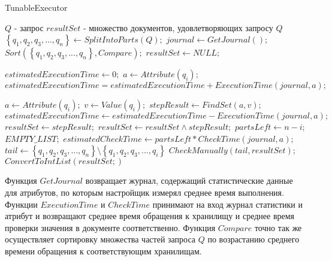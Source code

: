 \documentclass{matmex-diploma}
\begin{document}
        \begin{algorithm}[H]                   
        \caption{TunableExecutor}              
        \label{tunable}                        
            \begin{algorithmic}        
                \REQUIRE $Q$ - запрос
                \ENSURE $resultSet$ - множество документов, удовлетворяющих запросу $Q$
                \STATE $\left\{ q_1, q_2, q_3, ... , q_n \right\} \leftarrow SplitIntoParts(Q);$
                \STATE $journal \leftarrow GetJournal();$
                \STATE $Sort(\left\{ q_1, q_2, q_3, ... , q_n \right\}, Compare);$
                \STATE $resultSet \leftarrow NULL;$
                
                \STATE $estimatedExecutionTime \leftarrow 0;$
                    \STATE $a \leftarrow Attribute(q_i);$
                    \STATE $estimatedExecutionTime = estimatedExecutionTime + ExecutionTime(journal, a);$
                \ENDFOR
                
                    \STATE $a \leftarrow Attribute(q_i);$
                    \STATE $v \leftarrow Value(q_i);$
                    \STATE $stepResult \leftarrow FindSet(a, v);$
                    \STATE $estimatedExecutionTime \leftarrow estimatedExecutionTime - ExecutionTime(journal, a);$
                        \STATE $resultSet \leftarrow stepResult;$
                    \ELSE
                        \STATE $resultSet \leftarrow resultSet \land stepResult;$
                    \ENDIF
                    \STATE $partsLeft \leftarrow n - i;$
                        \RETURN $EMPTY\_LIST;$
                    \ENDIF
                    \STATE $estimatedCheckTime \leftarrow partsLeft * CheckTime(journal, a);$
                        \STATE $tail \leftarrow \left\{ q_1, q_2, q_3, ... , q_n \right\} \setminus \left\{ q_1, q_2, q_3, ... , q_i \right\}$
                        \RETURN $CheckManually(tail, resultSet);$
                    \ENDIF
                \ENDFOR
                \RETURN $ConvertToIntList(resultSet;)$
            \end{algorithmic}
        \end{algorithm}
        
        Функция $GetJournal$ возвращает журнал, содержащий статистические данные для атрибутов, по которым настройщик измерял среднее время выполнения. Функции $ExecutionTime$ и $CheckTime$ принимают на вход журнал статистики и атрибут и возвращают среднее время обращения к хранилищу и среднее время проверки значения в документе соответственно. Функция $Compare$ точно так же осуществляет сортировку множества частей запроса $Q$ по возрастанию среднего времени обращения к соответствующим хранилищам.   
        
\end{document}
